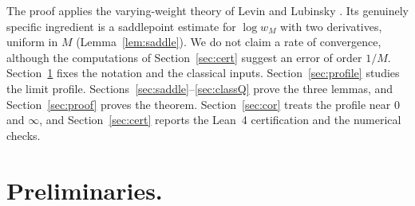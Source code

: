 \documentclass{math}
\begin{document}
The proof applies the varying-weight theory of Levin and Lubinsky \cite{levinlubinsky2018}. Its genuinely specific ingredient is a saddlepoint estimate for $\log w_M$ with two derivatives, uniform in $M$ (Lemma~\ref{lem:saddle}). We do not claim a rate of convergence, although the computations of Section~\ref{sec:cert} suggest an error of order $1/M$. Section~\ref{sec:prelim} fixes the notation and the classical inputs. Section~\ref{sec:profile} studies the limit profile. Sections~\ref{sec:saddle}--\ref{sec:classQ} prove the three lemmas, and Section~\ref{sec:proof} proves the theorem. Section~\ref{sec:cor} treats the profile near $0$ and $\infty$, and Section~\ref{sec:cert} reports the Lean~4 certification and the numerical checks.

\section{Preliminaries.}\label{sec:prelim}
\end{document}
